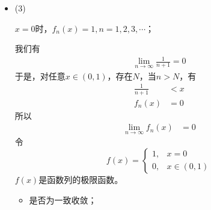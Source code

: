 \documentclass{article}
\begin{document}
\begin{itemize}
        考虑
        \begin{align*}
          |f_n(x) - f(x)|
           & = \left|\frac{x}{1 + n^2x^2}\right|                 \\
           & = \frac{|x|}{1 + n^2x^2}                            \\
           & = \frac{1}{\frac{1}{|x|} + n^2|x|}                  \\
           & \leq \frac{1}{ 2 \sqrt{\frac{1}{|x|} \cdot n^2|x|}} \\
           & = \frac{1}{ 2 n}
        \end{align*}
        于是，我们有
        \begin{align*}
          0 \leq \sup\limits_{x \in (-\infty, +\infty)} |f_n(x) - f(x)| \leq \frac{1}{2n}
        \end{align*}
        由迫敛性可知
        \begin{align*}
          \lim\limits_{n \to \infty} \sup\limits_{x \in (-\infty, +\infty)} |f_n(x) - f(x)| = 0
        \end{align*}

  \item (3)

        $x = 0$时，$f_n (x) = 1, n = 1, 2, 3, \cdots$；

        我们有
        \begin{align*}
          \lim\limits_{n \to \infty} \frac{1}{n + 1} = 0
        \end{align*}
        于是，对任意$x \in (0, 1)$，存在$N$，当$n > N$，有
        \begin{align*}
          \frac{1}{n + 1} & < x \\
          f_n(x)          & = 0
        \end{align*}
        所以
        \begin{align*}
          \lim\limits_{n \to \infty} f_n(x)
           & = 0
        \end{align*}
        令
        \begin{equation*}
          f(x) =
          \begin{cases}
            1, & x = 0        \\
            0, & x \in (0, 1)
          \end{cases}
        \end{equation*}
        $f(x)$是函数列的极限函数。

        \begin{itemize}
          \item 是否为一致收敛；


\end{itemize}
\end{itemize}
\end{document}
